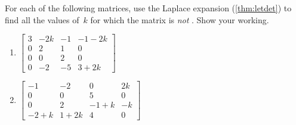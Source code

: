 \begin{exercise}  
For each of the following matrices, use the Laplace expansion (\cref{thm:letdet}) to find all the values of~\(k\) for which the matrix is \emph{not} .
Show your working.

\begin{enumerate}
\item \(\begin{bmatrix} 3 & -2k & -1 & -1-2k
\\0 & 2 & 1 & 0
\\0 & 0 & 2 & 0
\\0 & -2 & -5 & 3+2k \end{bmatrix}\)

\item \(\begin{bmatrix} -1 & -2 & 0 & 2k
\\0 & 0 & 5 & 0
\\0 & 2 & -1+k & -k
\\-2+k & 1+2k & 4 & 0 \end{bmatrix}\)



\end{enumerate}
\end{exercise}
